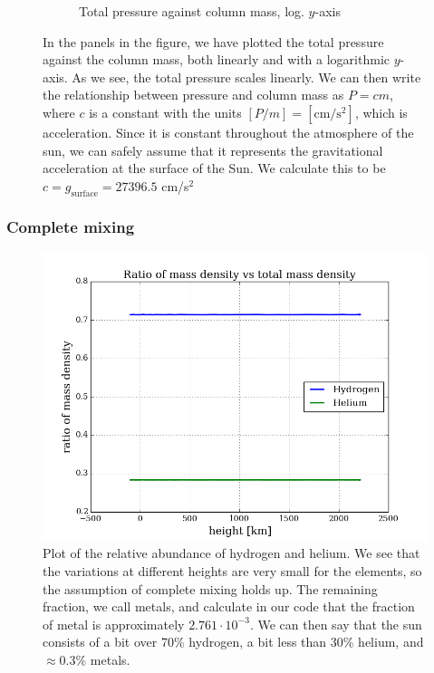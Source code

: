 \documentclass{article}
\begin{document}
\begin{figure}[H]
\begin{subfigure}{0.49\textwidth}
    \caption{Total pressure against column mass, log. $y$-axis}
  \end{subfigure}
  \caption{In the panels in the figure, we have plotted the total pressure against the column mass, both linearly and with a logarithmic $y$-axis. As we see, the total pressure scales linearly. We can then write the relationship between pressure and column mass as $P = cm$, where $c$ is a constant with the units $[P/m] = [\text{cm}/\text{s}^2]$, which is acceleration. Since it is constant throughout the atmosphere of the sun, we can safely assume that it represents the gravitational acceleration at the surface of the Sun. We calculate this to be $c = g_{\text{surface}} = 27396.5$ cm/s$^2$}
\end{figure}

\subsubsection{Complete mixing}

\begin{figure}[H]
  \centering
  \includegraphics[scale=0.5]{../figures/falc/falc_h_dens.png}
  \caption{Plot of the relative abundance of hydrogen and helium. We see that the variations at different heights are very small for the elements, so the assumption of complete mixing holds up. The remaining fraction, we call metals, and calculate in our code that the fraction of metal is approximately $2.761\cdot10^{-3}$. We can then say that the sun consists of a bit over 70\% hydrogen, a bit less than 30\% helium, and $\approx0.3$\% metals.}
\end{figure}
\end{document}

